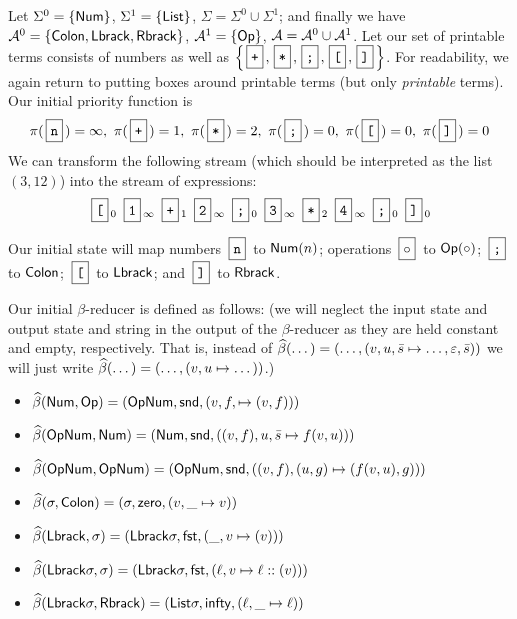 \documentclass{llncs}
\begin{document}
\begin{example}

    Let $\Sigma^0=\set\NUM$, $\Sigma^1=\set\LIST$, $\Sigma=\Sigma^0\cup\Sigma^1$; and finally we have $\c A^0=\set{\COLON,\LBRACK,\RBRACK}$, $\c A^1=\set\OP$, $\mathcal{A}=\mathcal{A}^0\cup\mathcal{A}^1$.
    Let our set of printable terms consists of numbers as well as $\set{\mbt+,\mbt*,\mbt;,\mbt[,\mbt]}$.
    For readability, we again return to putting boxes around printable terms (but only \textit{printable} terms).
    Our initial priority function is
    \[ \pi(\mbt n) = \infty,\ \pi(\mbt+) = 1,\ \pi(\mbt*) = 2,\ \pi(\mbt;) = 0,\ \pi(\mbt[) = 0,\ \pi(\mbt]) = 0 \]
    We can transform the following stream \ttt{[1 + 2; 3 * 4;]} (which should be interpreted as the list $(3,12)$) into the stream of expressions:
    \[ \mbt[_0\ \mbt1_\infty\ \mbt+_1\ \mbt2_\infty\ \mbt;_0\ \mbt3_\infty\ \mbt*_2\ \mbt4_\infty\ \mbt;_0\ \mbt]_0 \]

    Our initial state will map numbers $\mbt n$ to $\mathsf{Num}(n)$; operations $\mbt{$\circ$}$ to $\mathsf{Op}(\circ)$; $\mbt;$ to $\mathsf{Colon}$; $\mbt[$ to $\mathsf{Lbrack}$; and $\mbt]$ to $\mathsf{Rbrack}$.

    Our initial $\beta$-reducer is defined as follows: (we will neglect the input state and output state and string in the output of the $\beta$-reducer as they are held constant and empty, respectively.
    That is, instead of $\widehat\beta(\dots)=(\dots,(v,u,\bar s\mapsto\dots,\varepsilon,\bar s))$ we will just write $\widehat\beta(\dots)=(\dots,(v,u\mapsto\dots))$.)
    \begin{itemize}
        \item $\widehat\beta(\mathsf{Num},\mathsf{Op})=(\mathsf{Op}\mathsf{Num},\mathsf{snd},(v,f,\mapsto(v,f)))$
        \item $\widehat\beta(\mathsf{Op}\mathsf{Num},\mathsf{Num})=(\mathsf{Num},\mathsf{snd},((v,f),u,\bar s\mapsto f(v,u)))$
        \item $\widehat\beta(\mathsf{Op}\mathsf{Num},\mathsf{Op}\mathsf{Num})=(\mathsf{Op}\mathsf{Num},\mathsf{snd},((v,f),(u,g)\mapsto (f(v,u),g)))$
        \item $\widehat\beta(\sigma,\mathsf{Colon})=(\sigma,{\sf zero},(v,\_\mapsto v))$
        \item $\widehat\beta(\mathsf{Lbrack},\sigma)=(\mathsf{Lbrack}\sigma,\mathsf{fst},(\_,v\mapsto(v)))$
        \item $\widehat\beta(\mathsf{Lbrack}\sigma,\sigma)=(\mathsf{Lbrack}\sigma,\mathsf{fst},(\ell,v\mapsto\ell::(v)))$
        \item $\widehat\beta(\mathsf{Lbrack}\sigma,\mathsf{Rbrack})=(\mathsf{List}\sigma,{\sf infty},(\ell,\_\mapsto\ell))$
    \end{itemize}


\end{example}
\end{document}
